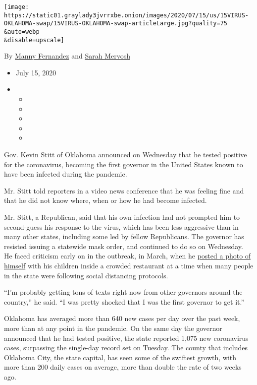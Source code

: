 \texttt{[image: https://static01.graylady3jvrrxbe.onion/images/2020/07/15/us/15VIRUS-OKLAHOMA-swap/15VIRUS-OKLAHOMA-swap-articleLarge.jpg?quality=75\\\&auto=webp\\\&disable=upscale]}

By \href{https://www.nytimes3xbfgragh.onion/by/manny-fernandez}{Manny
Fernandez} and
\href{https://www.nytimes3xbfgragh.onion/by/sarah-mervosh}{Sarah
Mervosh}

\begin{itemize}
\item
  July 15, 2020
\item
  \begin{itemize}
  \item
  \item
  \item
  \item
  \item
  \end{itemize}
\end{itemize}

Gov. Kevin Stitt of Oklahoma announced on Wednesday that he tested
positive for the coronavirus, becoming the first governor in the United
States known to have been infected during the pandemic.

Mr. Stitt told reporters in a video news conference that he was feeling
fine and that he did not know where, when or how he had become infected.

Mr. Stitt, a Republican, said that his own infection had not prompted
him to second-guess his response to the virus, which has been less
aggressive than in many other states, including some led by fellow
Republicans. The governor has resisted issuing a statewide mask order,
and continued to do so on Wednesday. He faced criticism early on in the
outbreak, in March, when he
\href{https://twitter.com/SculptorJon/status/1239021903454453761}{posted
a photo of himself} with his children inside a crowded restaurant at a
time when many people in the state were following social distancing
protocols.

``I'm probably getting tons of texts right now from other governors
around the country,'' he said. ``I was pretty shocked that I was the
first governor to get it.''

Oklahoma has averaged more than 640 new cases per day over the past
week, more than at any point in the pandemic. On the same day the
governor announced that he had tested positive, the state reported 1,075
new coronavirus cases, surpassing the single-day record set on Tuesday.
The county that includes Oklahoma City, the state capital, has seen some
of the swiftest growth, with more than 200 daily cases on average, more
than double the rate of two weeks ago.

